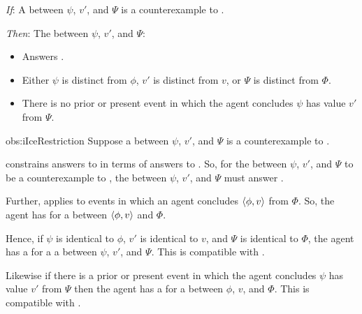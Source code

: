 \begin{note}
  \begin{observation}%
    \label{obs:iIceRestriction}%
    \begin{itenum}
    \item[\emph{If}:]
      A \ros{} between \(\psi\), \(v'\), and \(\Psi\) is a counterexample to \issueInclusion{}.
    \item[\emph{Then}:]
      The \ros{} between \(\psi\), \(v'\), and \(\Psi\):
      \begin{itemize}
      \item
        Answers \qWhy{}.
      \item
        Either \(\psi\) is distinct from \(\phi\), \(v'\) is distinct from \(v\), or \(\Psi\) is distinct from \(\Phi\).
      \item
        There is no prior or present event in which the agent concludes \(\psi\) has value \(v'\) from \(\Psi\).
      \end{itemize}
    \end{itenum}
    \vspace{-1.5\baselineskip}
  \end{observation}
  \begin{motivation}{obs:iIceRestriction}
    \color{blue}
    Suppose a \ros{} between \(\psi\), \(v'\), and \(\Psi\) is a counterexample to \issueInclusion{}.

    \issueInclusion{} constrains answers to \qWhy{} in terms of answers to \qHow{}.
    So, for the \ros{} between \(\psi\), \(v'\), and \(\Psi\) to be a counterexample to \issueInclusion{}, the \ros{} between \(\psi\), \(v'\), and \(\Psi\) must answer \qWhy{}.

    Further, \qWhy{} applies to events in which an agent concludes \(\langle \phi, v \rangle\) from \(\Phi\).
    So, the agent has \wit{} for a \ros{} between \(\langle \phi, v \rangle\) and \(\Phi\).

    Hence, if \(\psi\) is identical to \(\phi\), \(v'\) is identical to \(v\), and \(\Psi\) is identical to \(\Phi\), the agent has a \wit{} for a a \ros{} between \(\psi\), \(v'\), and \(\Psi\).
    This is compatible with \issueInclusion{}.

    Likewise if there is a prior or present event in which the agent concludes \(\psi\) has value \(v'\) from \(\Psi\) then the agent has a \wit{} for a \ros{} between \(\phi\), \(v\), and \(\Phi\).
    This is compatible with \issueInclusion{}.
  \end{motivation}


\end{note}
